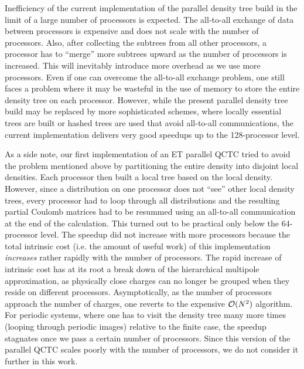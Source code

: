 \commentoutA{\documentclass[prl,aps,twocolumn,twocolumngrid,superbib]{revtex4}}
\begin{document}
Inefficiency of the current implementation of the parallel density
tree build in the limit of a large number of processors is expected.
The all-to-all exchange of data between processors is expensive and
does not scale with the number of processors. Also, after collecting
the subtrees from all other processors, a processor has to ``merge''
more subtrees upward as the number of processors is increased. This
will inevitably introduce more overhead as we use more processors.
Even if one can overcome the all-to-all exchange problem, one still
faces a problem where it may be wasteful in the use of memory to store
the entire density tree on each processor.  However, while the present
parallel density tree build may be replaced by more sophisticated
schemes, where locally essential trees are built\cite{MWarren92} or
hashed trees are used\cite{MWarren93,MWarren95b} that avoid all-to-all communications,
the current
implementation delivers very good speedups up to the 128-processor
level.

As a side note, our first implementation of an ET parallel QCTC tried
to avoid the problem mentioned above by partitioning the entire
density into disjoint local densities. Each processor then built a
local tree based on the local density. However, since a distribution
on one processor does not ``see'' other local density trees, every
processor had to loop through all distributions and the resulting
partial Coulomb matrices had to be resummed using an all-to-all
communication at the end of the calculation. This turned out to be
practical only below the 64-processor level. The speedup did not
increase with more processors because the total intrinsic cost
(i.e. the amount of useful work) of this implementation {\it increases} rather
rapidly with the number of processors. The rapid increase of intrinsic
cost has at its root a break down of the hierarchical multipole
approximation, as physically close charges can no longer be grouped
when they reside on different processors.  Asymptotically, as the
number of processors approach the number of charges, one reverts to
the expensive ${\cal O}(N^2)$ algorithm.  For periodic systems, where
one has to visit the density tree many more times (looping through
periodic images) relative to the finite case, the speedup stagnates
once we pass a certain number of processors. Since this version of the
parallel QCTC scales poorly with the number of processors, we do not
consider it further in this work.
\end{document}
